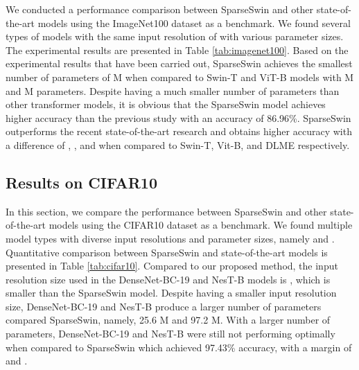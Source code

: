 \documentclass[runningheads]{llncs}
\begin{document}
We conducted a performance comparison between SparseSwin and other state-of-the-art models using the ImageNet100 dataset as a benchmark. We found several types of models with the same input resolution of  with various parameter sizes. The experimental results are presented in Table \ref{tab:imagenet100}. Based on the experimental results that have been carried out, SparseSwin achieves the smallest number of parameters of  M when compared to Swin-T \cite{liu2021swin} and ViT-B \cite{dosovitskiy2020image}  models with  M and  M parameters. Despite having a much smaller number of parameters than other transformer models, it is obvious that the SparseSwin model achieves higher accuracy than the previous study with an accuracy of 86.96\%. SparseSwin outperforms the recent state-of-the-art research and obtains higher accuracy with a difference of , , and  when compared to Swin-T, Vit-B, and DLME \cite{zang2022dlme} respectively.  

\begin{table}[bp]
\extracolsep{\fill}
\def\arraystretch{1.25}\centering
\large
\caption{Quantitative Comparison on ImageNet100}
\label{tab:imagenet100}
\end{table}

\subsection{Results on CIFAR10}
\label{sec:cifar10}
In this section, we compare the performance between SparseSwin and other state-of-the-art models using the CIFAR10 dataset as a benchmark. We found multiple model types with diverse input resolutions and parameter sizes, namely  and . Quantitative comparison between SparseSwin and state-of-the-art models is presented in Table \ref{tab:cifar10}. Compared to our proposed method, the input resolution size used in the DenseNet-BC-19 \cite{zhang2017mixup} and NesT-B \cite{zhang2022nested} models is , which is smaller than the SparseSwin model. Despite having a smaller input resolution size, DenseNet-BC-19 and NesT-B produce a larger number of parameters compared SparseSwin, namely, 25.6 M and 97.2 M. With a larger number of parameters, DenseNet-BC-19 and NesT-B were still not performing optimally when compared to SparseSwin which achieved 97.43\% accuracy, with a margin of  and . 
\end{document}
